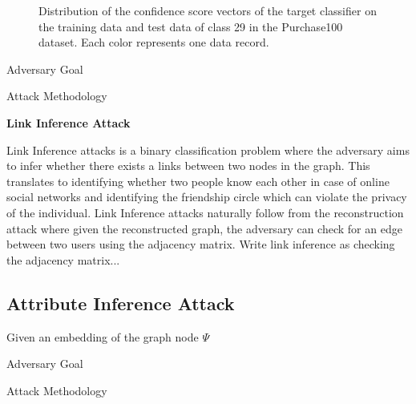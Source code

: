 \begin{figure}[!htb]
    \centering
    \begin{minipage}[b]{1\linewidth}
    \centering


    \end{minipage}
    \caption{Distribution of the confidence score vectors of the target classifier on the training data and test data of class 29 in the Purchase100 dataset. Each color represents one data record.}
    \label{fig:recattack}
\end{figure}

Adversary Goal


Attack Methodology

\textbf{Link Inference Attack}

Link Inference attacks is a binary classification problem where the adversary aims to infer whether there exists a links between two nodes in the graph.
This translates to identifying whether two people know each other in case of online social networks and identifying the friendship circle which can violate the privacy of the individual.
Link Inference attacks naturally follow from the reconstruction attack where given the reconstructed graph, the adversary can check for an edge between two users using the adjacency matrix.
Write link inference as checking the adjacency matrix...


\subsection{Attribute Inference Attack}

Given an embedding of the graph node $\Psi$

Adversary Goal

Attack Methodology
